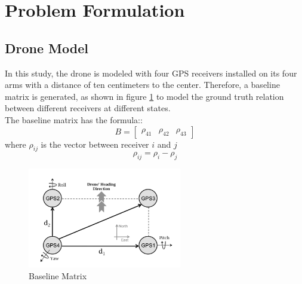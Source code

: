 \documentclass[journal,onecolumn]{IEEEtran}
\begin{document}
\section{Problem Formulation}
\subsection{Drone Model}
In this study, the drone is modeled with four GPS receivers installed on its four arms with a distance of ten centimeters to the center. Therefore, a baseline matrix is generated, as shown in figure \ref{drone} to
model the ground truth relation between different receivers at different states.\\
The baseline matrix has the formula::
\begin{equation}
  B = \begin{bmatrix}\rho_{41}& \rho_{42}& \rho_{43}\end{bmatrix}
\end{equation}
where $\rho_{ij}$ is the vector between receiver $i$ and $j$
\begin{equation}
  \rho_{ij} = \rho_{i} - \rho_{j}
\end{equation}
\begin{figure}
  \centering
  \captionsetup{justification=centering}
  \includegraphics[width=0.6\textwidth]{fig/drone.png}
  \caption{Baseline Matrix}
  \label{drone}
\end{figure}
\end{document}
